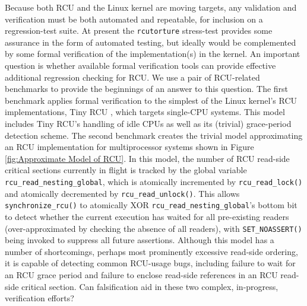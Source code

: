 \documentclass[conference]{IEEEtran}
\begin{document}
Because both RCU and the Linux kernel are moving targets, any validation
and verification must be both automated and repeatable, for inclusion
on a regression-test suite.  At present the {\tt rcutorture}
stress-test provides some assurance in the form of automated testing,
but ideally would be complemented by some formal verification of the
implementation(s) in the kernel.  An important question is whether
available formal verification tools can provide effective additional
regression checking for RCU.
We use a pair of RCU-related benchmarks \cite{PaulBlog1,PaulBlog2} to
provide the beginnings of an answer to this question.  The first
benchmark applies formal verification to the simplest of the Linux
kernel's RCU implementations, Tiny RCU
\cite{PaulEMcKenney2009BloatwatchRCU}, which targets single-CPU
systems.  This model includes Tiny RCU's handling of idle CPUs as well
as its (trivial) grace-period detection scheme.  The second benchmark
creates the trivial model approximating an RCU implementation for
multiprocessor systems shown in Figure \ref{fig:Approximate Model of
  RCU}.  In this model, the number of RCU read-side critical sections
currently in flight is tracked by the global variable
{\tt rcu\_read\_nesting\_global}, which is atomically incremented by
{\tt rcu\_read\_lock()} and atomically decremented by
{\tt rcu\_read\_unlock()}.  This allows {\tt synchronize\_rcu()} to
atomically XOR {\tt rcu\_read\_nesting\_global}'s bottom bit to detect
whether the current execution has waited for all pre-existing readers
(over-approximated by checking the absence of all readers), with
{\tt SET\_NOASSERT()} being invoked to suppress all future assertions.
Although this model has a number of shortcomings, perhaps most
prominently excessive read-side ordering, it is capable of detecting
common RCU-usage bugs, including failure to wait for an RCU grace
period and failure to enclose read-side references in an RCU read-side
critical section.  Can falsification aid in these two complex,
in-progress, verification efforts?
\end{document}
